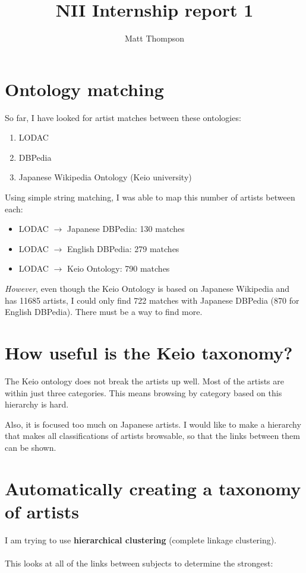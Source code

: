 \documentclass[11pt]{article}
\title{NII Internship report 1}
\author{Matt Thompson}
\begin{document}
\section{Ontology matching}
So far, I have looked for artist matches between these ontologies:

\begin{enumerate}
	\item LODAC
	\item DBPedia
	\item Japanese Wikipedia Ontology (Keio university)
\end{enumerate}

Using simple string matching, I was able to map this number of artists between each:

\begin{itemize}
	\item LODAC $\rightarrow$ Japanese DBPedia: 130 matches
	\item LODAC $\rightarrow$ English DBPedia: 279 matches
	\item LODAC $\rightarrow$ Keio Ontology: 790 matches
\end{itemize}

\emph{However}, even though the Keio Ontology is based on Japanese Wikipedia and has 11685 artists, I could only find 722 matches with Japanese DBPedia (870 for English DBPedia). There must be a way to find more.

\section{How useful is the Keio taxonomy?}
The Keio ontology does not break the artists up well. Most of the artists are within just three categories. This means browsing by category based on this hierarchy is hard.

Also, it is focused too much on Japanese artists. I would like to make a hierarchy that makes all classifications of artists browsable, so that the links between them can be shown.

\section{Automatically creating a taxonomy of artists}
I am trying to use {\bf hierarchical clustering} (complete linkage clustering).

\paragraph{} This looks at all of the links between subjects to determine the strongest:
\end{document}
